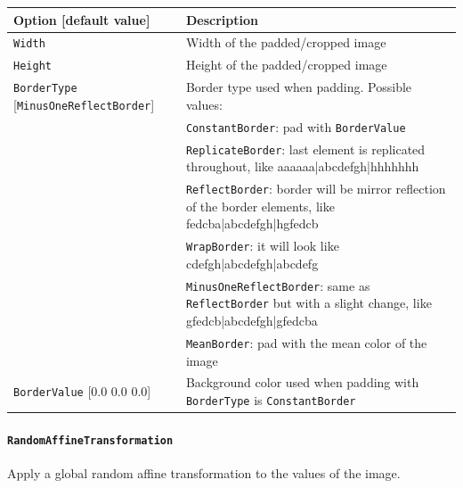 \documentclass[a4paper,11pt,oneside]{article}
\newcommand{\iponly}{\reversemarginpar
    \marginnote{\color{listletiblue}\normalfont\scriptsize
    {\ttfamily{}\hyperref[sec:N2D2-IP]{\color{listletiblue}N2D2 IP}} \emph{only}}}
\begin{document}
\begin{center}
 \begin{tabular}{| p{5cm} | p{10cm} | }
 \hline
 Option [default value] & Description\\
 \hline\hline
  \cellcolor{requiredcolor}\lstinline!Width! & Width of the padded/cropped
  image \\
  \cellcolor{requiredcolor}\lstinline!Height! & Height of the padded/cropped
   image \\
  \lstinline!BorderType! [\lstinline!MinusOneReflectBorder!] & Border type
  used when padding. Possible values: \\
   & \lstinline!ConstantBorder!: pad with \lstinline!BorderValue! \\
   & \lstinline!ReplicateBorder!: last element is replicated throughout, like aaaaaa|abcdefgh|hhhhhhh \\
   & \lstinline!ReflectBorder!: border will be mirror reflection of the border elements, like fedcba|abcdefgh|hgfedcb \\
   & \lstinline!WrapBorder!: it will look like cdefgh|abcdefgh|abcdefg \\
   & \lstinline!MinusOneReflectBorder!: same as \lstinline!ReflectBorder! but with a slight change, like gfedcb|abcdefgh|gfedcba \\
   & \lstinline!MeanBorder!: pad with the mean color of the image \\
   \lstinline!BorderValue! [0.0 0.0 0.0] & Background color
   used when padding with \lstinline!BorderType! is \lstinline!ConstantBorder! \\
 \hline
\end{tabular}
\end{center}

\paragraph{\texorpdfstring{%
\lstinline[basicstyle=\ttfamily\bfseries]!RandomAffineTransformation!%
\protect\iponly}{RandomAffineTransformation}}
Apply a global random affine transformation to the values of the image.
\end{document}

